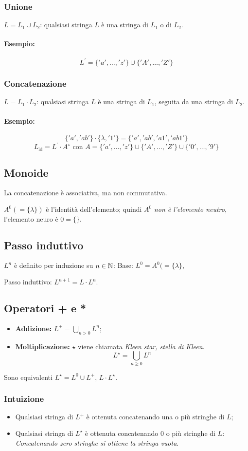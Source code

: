 \subsubsection{Unione}
$L=L_1\cup L_2$: qualsiasi stringa $L$ è una stringa di $L_1$ o di $L_2$.
\paragraph{Esempio:}
\[L^\prime = \{'a',\dots,'z'\}\cup\{'A',\dots,'Z'\} \]

\subsubsection{Concatenazione}
$L=L_1\cdot L_2$: qualsiasi stringa $L$ è una stringa di $L_1$, seguita da una
stringa di $L_2$.
\paragraph{Esempio:}
\[\{'a','ab'\}\cdot\{\lambda,'1'\}=\{'a','ab','a1','ab1'\}\]
\[L_{\text{id}}=L^\prime\cdot A^\star \text{ con }A=\{'a',\dots,'z'\}\cup\{'A',\dots,'Z'\}\cup\{'0',\dots,'9'\} \]

\subsection{Monoide}
La concatenazione è associativa, ma non commutativa.

$A^0(=\{\lambda\})$ è l'identità dell'elemento; quindi $A^0$ \emph{non è
l'elemento neutro}, l'elemento neuro è $0=\{\}$.

\subsection{Passo induttivo}
$L^n$ è definito per induzione su $n\in\mathbb{N}$:
Base: $L^0=A^0(=\{\lambda\}$,

Passo induttivo: $L^{n+1}=L\cdot L^n$.

\subsection{Operatori + e *}
\begin{itemize}
  \item \textbf{Addizione:} $L^+=\bigcup_{n>0}L^n$;
  \item \textbf{Moltiplicazione:} $\star$ viene chiamata \textit{Kleen star,
    stella di Kleen}.
    \[L^\star = \bigcup_{n\geq0}L^n\]
\end{itemize}
Sono equivalenti $L^\star=L^0\cup L^+$, $L\cdot L^\star$.

\subsubsection{Intuizione}
\begin{itemize}
  \item Qualsiasi stringa di $L^+$ è ottenuta concatenando una o più stringhe
    di $L$;
  \item Qualsiasi stringa di $L^\star$ è ottenuta concatenando $0$ o più
    stringhe di $L$: \emph{Concatenando zero stringhe si ottiene la stringa
    vuota}.
\end{itemize}
